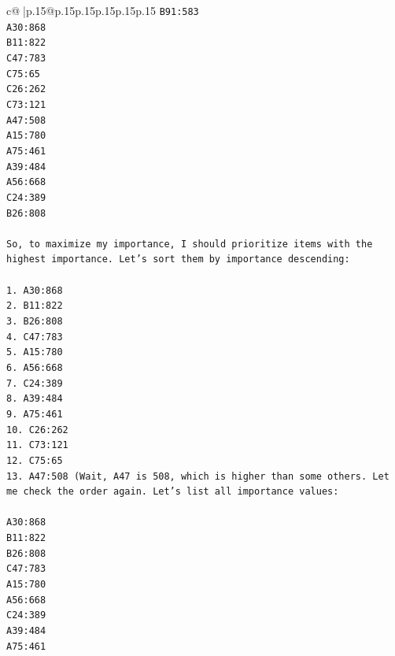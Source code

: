\documentclass{article}
\begin{document}
{\begin{supertabular}{c@{$\;$}|p{.15\linewidth}@{}p{.15\linewidth}p{.15\linewidth}p{.15\linewidth}p{.15\linewidth}p{.15\linewidth}}
{{{\texttt{B91:583} \\
\texttt{A30:868} \\
\texttt{B11:822} \\
\texttt{C47:783} \\
\texttt{C75:65} \\
\texttt{C26:262} \\
\texttt{C73:121} \\
\texttt{A47:508} \\
\texttt{A15:780} \\
\texttt{A75:461} \\
\texttt{A39:484} \\
\texttt{A56:668} \\
\texttt{C24:389} \\
\texttt{B26:808} \\
\\ 
\texttt{So, to maximize my importance, I should prioritize items with the highest importance. Let's sort them by importance descending:} \\
\\ 
\texttt{1. A30:868} \\
\texttt{2. B11:822} \\
\texttt{3. B26:808} \\
\texttt{4. C47:783} \\
\texttt{5. A15:780} \\
\texttt{6. A56:668} \\
\texttt{7. C24:389} \\
\texttt{8. A39:484} \\
\texttt{9. A75:461} \\
\texttt{10. C26:262} \\
\texttt{11. C73:121} \\
\texttt{12. C75:65} \\
\texttt{13. A47:508 (Wait, A47 is 508, which is higher than some others. Let me check the order again. Let's list all importance values:} \\
\\ 
\texttt{A30:868} \\
\texttt{B11:822} \\
\texttt{B26:808} \\
\texttt{C47:783} \\
\texttt{A15:780} \\
\texttt{A56:668} \\
\texttt{C24:389} \\
\texttt{A39:484} \\
\texttt{A75:461} \\
}}}
\end{supertabular}}
\end{document}
